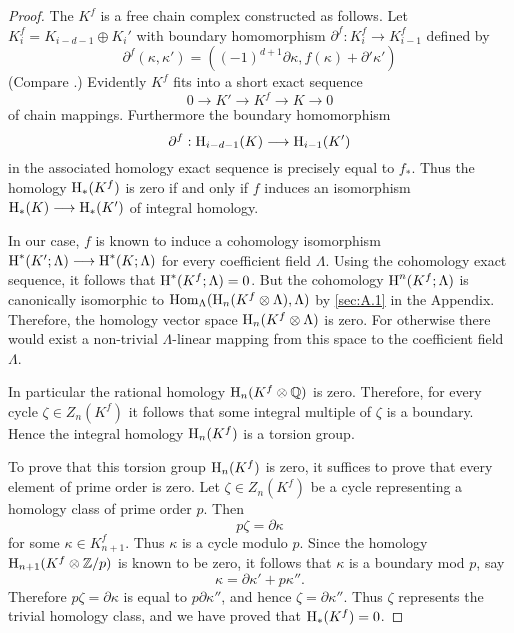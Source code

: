 \documentclass[../main]{subfiles}
\begin{document}
\begin{proof}
The  $K^f$ is a free chain complex constructed as follows. Let $K^f_i = K_{i - d - 1} \oplus K_i'$ with boundary homomorphism $\partial^f : K_i^f \longrightarrow K_{i - 1}^f$ defined by \[\partial^f(\kappa, \kappa') = ((-1)^{d + 1} \partial \kappa, f(\kappa) + \partial' \kappa')\] (Compare \cite[pp. 166]{spanier1981}.) Evidently $K^f$ fits into a short exact sequence \[0 \longrightarrow K' \longrightarrow K^f \longrightarrow K \longrightarrow 0\] of chain mappings. Furthermore the boundary homomorphism \[\partial^f : \operatorname{H}_{i - d - 1}(K) \longrightarrow \operatorname{H}_{i - 1}(K')\] in the associated homology exact sequence is precisely equal to $f_\ast$. Thus the homology $\operatorname{H}_\ast(K^f)$ is zero if and only if $f$ induces an isomorphism \newline $\operatorname{H}_\ast(K) \longrightarrow \operatorname{H}_\ast(K')$ of integral homology. 

In our case, $f$ is known to induce a cohomology isomorphism \newline $\operatorname{H}^\ast(K'; \Lambda) \longrightarrow \operatorname{H}^\ast(K; \Lambda)$ for every coefficient field $\Lambda$. Using the cohomology exact sequence, it follows that $\operatorname{H}^\ast(K^f; \Lambda) = 0$. But the cohomology $\operatorname{H}^n(K^f; \Lambda)$ is canonically isomorphic to $\operatorname{Hom}_\Lambda(\operatorname{H}_n(K^f \otimes \Lambda), \Lambda)$ by \ref{sec:A.1} in the Appendix. Therefore, the homology vector space $\operatorname{H}_n(K^f \otimes \Lambda)$ is zero. For otherwise there would exist a non-trivial $\Lambda$-linear mapping from this space to the coefficient field $\Lambda$.

In particular the rational homology $\operatorname{H}_n(K^f \otimes \mathbb Q)$ is zero. Therefore, for every cycle $\zeta \in Z_n(K^f)$ it follows that some integral multiple of $\zeta$ is a boundary. Hence the integral homology $\operatorname{H}_n(K^f)$ is a torsion group. 

To prove that this torsion group $\operatorname{H}_n(K^f)$ is zero, it suffices to prove that every element of prime order is zero. Let $\zeta \in Z_n(K^f)$ be a cycle representing a homology class of prime order $p$. Then \[p \zeta = \partial \kappa\] for some $\kappa \in K_{n + 1}^f$. Thus $\kappa$ is a cycle modulo $p$. Since the homology \newline $\operatorname{H}_{n + 1}(K^f \otimes \mathbb Z/p)$ is known to be zero, it follows that $\kappa$ is a boundary mod $p$, say \[\kappa = \partial \kappa' + p \kappa''.\] Therefore $p \zeta = \partial \kappa$ is equal to $p \partial \kappa''$, and hence $\zeta = \partial \kappa''$. Thus $\zeta$ represents the trivial homology class, and we have proved that $\operatorname{H}_\ast(K^f) = 0$. 


\end{proof}
\end{document}
